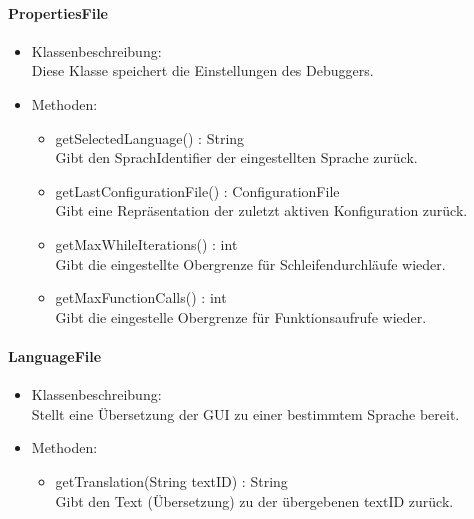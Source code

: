 \documentclass[parskip=full]{scrartcl}
\begin{document}
\paragraph{PropertiesFile}
\begin{itemize}
\item Klassenbeschreibung: \\
Diese Klasse speichert die Einstellungen des Debuggers.
\item Methoden: \\
\begin{itemize}
\item getSelectedLanguage() : String \\
Gibt den SprachIdentifier der eingestellten Sprache zurück.
\item getLastConfigurationFile() : ConfigurationFile \\
Gibt eine Repräsentation der zuletzt aktiven Konfiguration zurück.
\item getMaxWhileIterations() : int \\
Gibt die eingestellte Obergrenze für Schleifendurchläufe wieder.
\item getMaxFunctionCalls() : int \\
Gibt die eingestelle Obergrenze für Funktionsaufrufe wieder.
\end{itemize}
\end{itemize}

\paragraph{LanguageFile}
\begin{itemize}
\item Klassenbeschreibung: \\
Stellt eine Übersetzung der GUI zu einer bestimmtem Sprache bereit.
\item Methoden: \\
\begin{itemize}
\item getTranslation(String textID) : String \\
Gibt den Text (Übersetzung) zu der übergebenen textID zurück.
\end{itemize}
\end{itemize}
\end{document}
